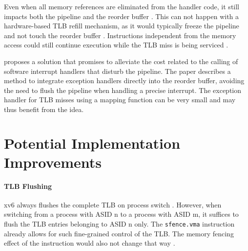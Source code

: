 Even when all memory references are eliminated from the handler code, it still impacts both the pipeline and the reorder buffer \cite{jacobSoftwaremanagedAddressTranslation1997}. This can not happen with a hardware-based TLB refill mechanism, as it would typically freeze the pipeline and not touch the reorder buffer \cite{bhattacharjee2017architectural}. Instructions independent from the memory access could still continue execution while the TLB miss is being serviced \cite{jacob1998virtualissues}.

\cite{jaleel2001line} proposes a solution that promises to alleviate the cost related to the calling of software interrupt handlers that disturb the pipeline. The paper describes a method to integrate exception handlers directly into the reorder buffer, avoiding the need to flush the pipeline when handling a precise interrupt. The exception handler for TLB misses using a mapping function can be very small and may thus benefit from the idea.








\section{Potential Implementation Improvements}

\paragraph{TLB Flushing} xv6 always flushes the complete TLB on process switch \cite{cox2011xv6}. However, when switching from a process with ASID n to a process with ASID m, it suffices to flush the TLB entries belonging to ASID n only. The \texttt{sfence.vma} instruction already allows for such fine-grained control of the TLB. The memory fencing effect of the instruction would also not change that way \cite{RISCVInstructionSet}.

